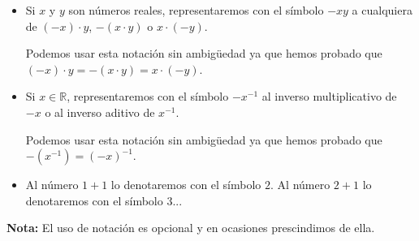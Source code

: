 \documentclass[11pt]{article}
\newcommand{\R}{\mathbb{R}}
\begin{document}
\begin{itemize}
\item Si $x$ y $y$ son números reales, representaremos con el símbolo $-xy$ a cualquiera de $(-x)\cdot y$, $-(x \cdot y)$ o $x\cdot (-y)$.

Podemos usar esta notación sin ambigüedad ya que hemos probado que $(-x)\cdot y = -(x \cdot y)=x\cdot (-y)$.
%
%
\item Si $x\in \R$, representaremos con el símbolo $-x^{-1}$ al inverso multiplicativo de $-x$ o al inverso aditivo de $x^{-1}$.
 
Podemos usar esta notación sin ambigüedad ya que hemos probado que $-(x^{-1})=(-x)^{-1}$.
%
%
%

\item Al número $1+1$ lo denotaremos con el símbolo $2$. Al número $2+1$ lo denotaremos con el símbolo $3$...
\end{itemize}


\textbf{Nota:} El uso de notación es opcional y en ocasiones prescindimos de ella.%

\end{document}
